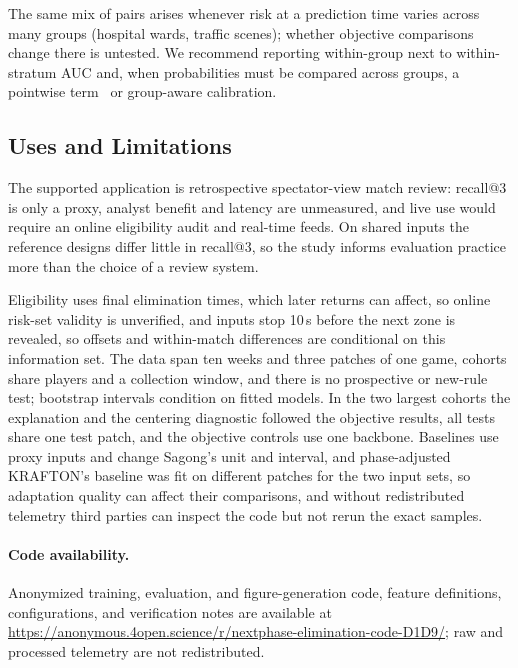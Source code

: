 \documentclass[sigconf,anonymous]{acmart}
\newcommand{\artifacturl}{\url{https://anonymous.4open.science/r/nextphase-elimination-code-D1D9/}}
\begin{document}
The same mix of pairs arises whenever risk at a prediction time varies across many groups (hospital wards, traffic scenes); whether objective comparisons change there is untested. We recommend reporting within-group next to within-stratum AUC and, when probabilities must be compared across groups, a pointwise term~\cite{Bai23} or group-aware calibration.

\subsection{Uses and Limitations}
\label{sec:discussion:limits}
The supported application is retrospective spectator-view match review: recall@3 is only a proxy, analyst benefit and latency are unmeasured, and live use would require an online eligibility audit and real-time feeds. On shared inputs the reference designs differ little in recall@3, so the study informs evaluation practice more than the choice of a review system.

Eligibility uses final elimination times, which later returns can affect, so online risk-set validity is unverified, and inputs stop 10\,s before the next zone is revealed, so offsets and within-match differences are conditional on this information set. The data span ten weeks and three patches of one game, cohorts share players and a collection window, and there is no prospective or new-rule test; bootstrap intervals condition on fitted models. In the two largest cohorts the explanation and the centering diagnostic followed the objective results, all tests share one test patch, and the objective controls use one backbone. Baselines use proxy inputs and change Sagong's unit and interval, and phase-adjusted KRAFTON's baseline was fit on different patches for the two input sets, so adaptation quality can affect their comparisons, and without redistributed telemetry third parties can inspect the code but not rerun the exact samples.

\paragraph{Code availability.}
Anonymized training, evaluation, and figure-generation code, feature definitions, configurations, and verification notes are available at \artifacturl{}; raw and processed telemetry are not redistributed.
\end{document}
